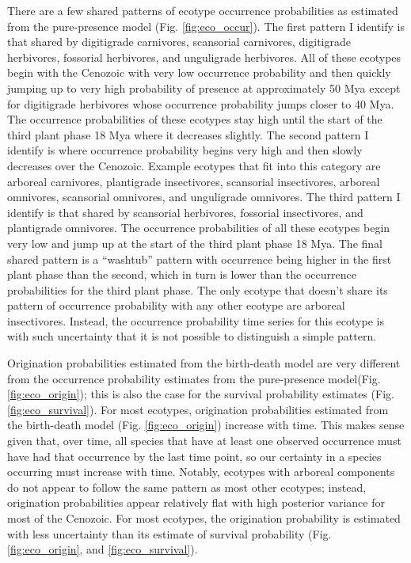 \documentclass[12pt,letterpaper]{article}
\begin{document}
There are a few shared patterns of ecotype occurrence probabilities as estimated from the pure-presence model (Fig. \ref{fig:eco_occur}). The first pattern I identify is that shared by digitigrade carnivores, scansorial carnivores, digitigrade herbivores, fossorial herbivores, and unguligrade herbivores. All of these ecotypes begin with the Cenozoic with very low occurrence probability and then quickly jumping up to very high probability of presence at approximately 50 Mya except for digitigrade herbivores whose occurrence probability jumps closer to 40 Mya. The occurrence probabilities of these ecotypes stay high until the start of the third plant phase 18 Mya where it decreases slightly. The second pattern I identify is where occurrence probability begins very high and then slowly decreases over the Cenozoic. Example ecotypes that fit into this category are arboreal carnivores, plantigrade insectivores, scansorial insectivores, arboreal omnivores, scansorial omnivores, and unguligrade omnivores. The third pattern I identify is that shared by scansorial herbivores, fossorial insectivores, and plantigrade omnivores. The occurrence probabilities of all these ecotypes begin very low and jump up at the start of the third plant phase 18 Mya. The final shared pattern is a ``washtub'' pattern with occurrence being higher in the first plant phase than the second, which in turn is lower than the occurrence probabilities for the third plant phase. The only ecotype that doesn't share its pattern of occurrence probability with any other ecotype are arboreal insectivores. Instead, the occurrence probability time series for this ecotype is with such uncertainty that it is not possible to distinguish a simple pattern. 

Origination probabilities estimated from the birth-death model are very different from the occurrence probability estimates from the pure-presence model(Fig. \ref{fig:eco_origin}); this is also the case for the survival probability estimates (Fig. \ref{fig:eco_survival}). 
For most ecotypes, origination probabilities estimated from the birth-death model (Fig. \ref{fig:eco_origin}) increase with time. This makes sense given that, over time, all species that have at least one observed occurrence must have had that occurrence by the last time point, so our certainty in a species occurring must increase with time. Notably, ecotypes with arboreal components do not appear to follow the same pattern as most other ecotypes; instead, origination probabilities appear relatively flat with high posterior variance for most of the Cenozoic. For most ecotypes, the origination probability is estimated with less uncertainty than its estimate of survival probability (Fig. \ref{fig:eco_origin}, and \ref{fig:eco_survival}). 
\end{document}
